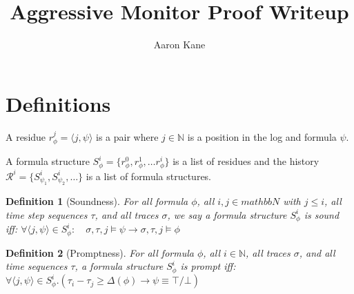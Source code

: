 \documentclass[10pt,a4paper]{article}
\title{Aggressive Monitor Proof Writeup}
\author{Aaron Kane}
\newcommand{\rp}[2]{\ensuremath{\langle #1, #2 \rangle}}
\newcommand{\res}[2]{\ensuremath{r_{#1}^{#2}}}
\newtheorem{tdef}{Definition}
\begin{document}
\maketitle

\section{Definitions}

A residue $\res{\phi}{j} = \rp{j}{\psi}$ is a pair where $j \in \mathbb{N}$ is a position in the log and formula $\psi$.

A formula structure $S_{\phi}^i = \{ r_{\phi}^0, r_{\phi}^1, \ldots r_{\phi}^i \}$ is a list of residues and the history $\mathcal{R}^i = \{ S_{\psi_1}^i, S_{\psi_2}^i,\ldots \}$ is a list of formula structures.



%
\begin{tdef}[Soundness] For all formula $\phi$, all $i,j \in mathbb{N}$ with $j \leq i$, all time step sequences $\tau$, and all traces $\sigma$, we say a formula structure $S^i_{\phi}$ is sound iff:
$\forall \rp{j}{\psi} \in S^i_{\phi}: \quad \sigma, \tau, j \vDash \psi \rightarrow \sigma, \tau, j \vDash \phi$
\end{tdef}


\begin{tdef}[Promptness]
For all formula $\phi$, all $i \in \mathbb{N}$, all traces $\sigma$, and all time sequences $\tau$, a formula structure $S^i_{\phi}$ is prompt iff: 
$\forall \rp{j}{\psi} \in S^i_{\phi}.( \tau_i - \tau_j \geq \Delta(\phi) \rightarrow \psi \equiv \top/\bot)$
\end{tdef}
\end{document}
